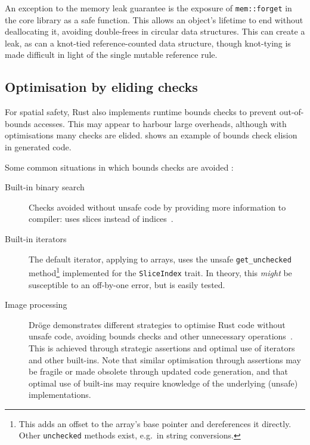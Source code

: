 \documentclass[dissertation.tex]{subfiles}
\begin{document}
An exception to the memory leak guarantee is the exposure of
\texttt{mem::forget} in the core library as a safe function.
This allows an object's lifetime to end without deallocating it,
avoiding double-frees in circular data structures.
This can create a leak, as can a knot-tied reference-counted data
structure, though knot-tying is made difficult in light of the single
mutable reference rule.


\subsection{Optimisation by eliding checks}
\label{sec:rust-elision}

For spatial safety, Rust also implements runtime bounds checks to
prevent out-of-bounds accesses.
This may appear to harbour large overheads, although with optimisations
many checks are elided.
 shows  an example of bounds
check elision in generated code.

Some common situations in which bounds checks are avoided :

\begin{description}
    \item[Built-in binary search] Checks avoided without unsafe code by
    providing more information to compiler: uses slices instead of
    indices~\cite{rust-pr-binarysearch}.
    \item[Built-in iterators] The default iterator, applying to arrays,
    uses the unsafe \texttt{get\_unchecked} method\footnote{This adds an
    offset to the array's base pointer and dereferences it directly.
    Other \texttt{unchecked} methods exist, e.g.\ in string
    conversions.} implemented for the \texttt{SliceIndex} trait.
    In theory, this \emph{might} be susceptible to an off-by-one error,
    but is easily tested.
    \item[Image processing] Dr\"oge demonstrates different strategies to
    optimise Rust code without unsafe code, avoiding bounds checks and
    other unnecessary operations~\cite{droge-opt}.
    This is achieved through strategic assertions and optimal use of
    iterators and other built-ins.
    Note that similar optimisation through assertions may be fragile or
    made obsolete through updated code generation, and that optimal use
    of built-ins may require knowledge of the underlying (unsafe)
    implementations.
\end{description}
\end{document}
